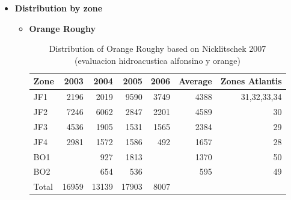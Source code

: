 \documentclass[11pt]{article}
\begin{document}
\begin{itemize}
\begin{itemize}
\begin{itemize}
\end{itemize}
\item \textbf{Distribution by zone}
\begin{itemize}
\item \textbf{Orange Roughy}
\begin{table}[htb]
\caption{Distribution of Orange Roughy based on Nicklitschek 2007 (evaluacion hidroacustica alfonsino y orange)}
\begin{center}
\begin{tabular}{lrrrrrr}
 Zone   &   2003  &   2004  &   2005  &  2006  &  Average  &  Zones Atlantis  \\
\hline
 JF1    &   2196  &   2019  &   9590  &  3749  &     4388  &     31,32,33,34  \\
 JF2    &   7246  &   6062  &   2847  &  2201  &     4589  &              30  \\
 JF3    &   4536  &   1905  &   1531  &  1565  &     2384  &              29  \\
 JF4    &   2981  &   1572  &   1586  &   492  &     1657  &              28  \\
 BO1    &         &    927  &   1813  &        &     1370  &              50  \\
 BO2    &         &    654  &    536  &        &      595  &              49  \\
\hline
 Total  &  16959  &  13139  &  17903  &  8007  &           &                  \\
\hline
\end{tabular}
\end{center}
\end{table}


\end{itemize}
\end{itemize}
\end{itemize}
\end{document}
